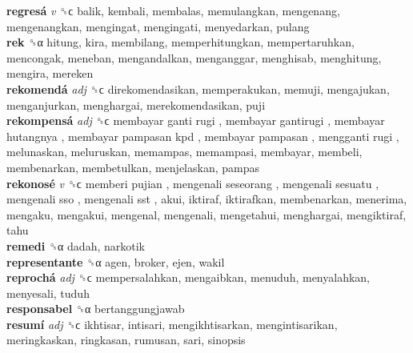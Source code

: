 \textbf{regresá} \emph{v}  ␝ϲ  balik, kembali, membalas, memulangkan, mengenang, mengenangkan, mengingat, mengingati, menyedarkan, pulang  \\
\textbf{rek} ␝α  hitung, kira, membilang, memperhitungkan, mempertaruhkan, mencongak, meneban, mengandalkan, menganggar, menghisab, menghitung, mengira, mereken  \\
\textbf{rekomendá} \emph{adj}  ␝ϲ  direkomendasikan, memperakukan, memuji, mengajukan, menganjurkan, menghargai, merekomendasikan, puji  \\
\textbf{rekompensá} \emph{adj}  ␝ϲ   membayar ganti rugi ,  membayar gantirugi ,  membayar hutangnya ,  membayar pampasan kpd ,  membayar pampasan ,  mengganti rugi , melunaskan, meluruskan, memampas, memampasi, membayar, membeli, membenarkan, membetulkan, menjelaskan, pampas  \\
\textbf{rekonosé} \emph{v}  ␝ϲ   memberi pujian ,  mengenali seseorang ,  mengenali sesuatu ,  mengenali sso ,  mengenali sst , akui, iktiraf, iktirafkan, membenarkan, menerima, mengaku, mengakui, mengenal, mengenali, mengetahui, menghargai, mengiktiraf, tahu  \\
\textbf{remedi} ␝α  dadah, narkotik  \\
\textbf{representante} ␝α  agen, broker, ejen, wakil  \\
\textbf{reprochá} \emph{adj}  ␝ϲ  mempersalahkan, mengaibkan, menuduh, menyalahkan, menyesali, tuduh  \\
\textbf{responsabel} ␝α  bertanggungjawab  \\
\textbf{resumí} \emph{adj}  ␝ϲ  ikhtisar, intisari, mengikhtisarkan, mengintisarikan, meringkaskan, ringkasan, rumusan, sari, sinopsis  \\
